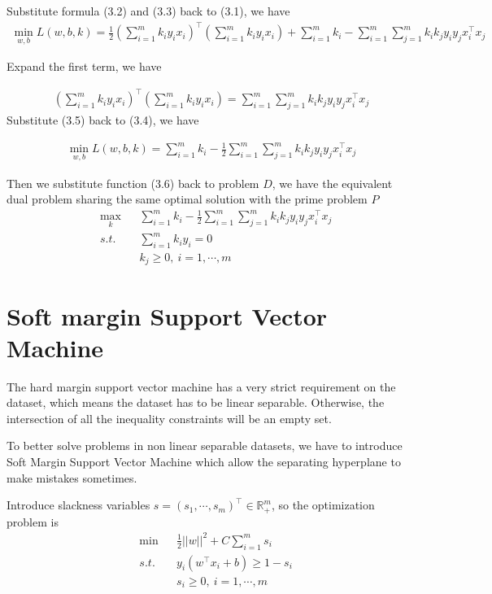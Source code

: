 \documentclass[a4paper]{report}
\begin{document}
Substitute formula (3.2) and (3.3) back to (3.1), we have
\begin{align}
    \min_{w,b} L(w,b,k) = \frac{1}{2}\left( \sum_{i=1}^m k_i y_i x_i \right)^\top \left( \sum_{i=1}^m k_i y_i x_i\right) + \sum_{i=1}^m k_i - \sum_{i=1}^m\sum_{j=1}^m k_i k_j y_i y_j x_i^\top x_j
\end{align}

Expand the first term, we have 

\begin{align}
    \left( \sum_{i=1}^m k_i y_i x_i \right)^\top \left( \sum_{i=1}^m k_i y_i x_i\right)= \sum_{i=1}^m\sum_{j=1}^m k_i k_j y_i y_j x_i^\top x_j
\end{align}
Substitute (3.5) back to (3.4), we have

\begin{align}
    \min_{w,b} L(w,b,k) = \sum_{i=1}^m k_i - \frac{1}{2} \sum_{i=1}^m\sum_{j=1}^m k_i k_j y_i y_j x_i^\top x_j
\end{align}

Then we substitute function (3.6) back to problem $D$, we have the equivalent dual problem sharing the same optimal solution with the prime problem $P$
\begin{align*}
    &\max_k & & \sum_{i=1}^m k_i - \frac{1}{2} \sum_{i=1}^m\sum_{j=1}^m k_i k_j y_i y_j x_i^\top x_j \\
    &s.t. \ & & \sum_{i=1}^m k_i y_i=0 \\
    & & & k_j\geq 0,\ i=1,\cdots,m
\end{align*}


\section{Soft margin Support Vector Machine}

The hard margin support vector machine has a very strict requirement on the dataset, which means the dataset has to be linear separable. Otherwise, the intersection of all the inequality constraints will be an empty set.

To better solve problems in non linear separable datasets, we have to introduce Soft Margin Support Vector Machine which allow the separating hyperplane to make mistakes sometimes.

Introduce slackness variables $s=(s_1,\cdots,s_m)^\top\in\mathbb R_+^m$, so the optimization problem is
\begin{align*}
    &\min & & \frac{1}{2} ||w||^2 + C\sum_{i=1}^m s_i \\
    &s.t. & & y_i(w^\top x_i +b)\geq 1 - s_i \\
    &     & & s_i\geq 0, \ i=1,\cdots,m
\end{align*}
\end{document}
